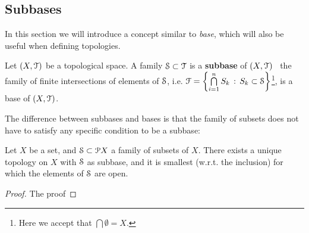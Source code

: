 \documentclass[12pt,spanish]{memoir}
\begin{document}
\subsection{Subbases}

In this section we will introduce a concept similar to \emph{base}, which will also be useful when defining topologies.

\begin{definition}
Let $(X, \T)$ be a topological space. A family $\S\subset \T$ is a \textbf{subbase} of $(X, \T)$ \iff\ the family of finite intersections of elements of $\S$,  i.e. $\F = \setdef{\bigcap\limits_{i=1}^nS_k}{S_k\subset \S}$\footnote{Here we accept that $\bigcap \emptyset = X$.}, is a base of $(X, \T)$.
\label{def:subbase}
\end{definition}

The difference between subbases and bases is that the family of subsets does not have to satisfy any specific condition to be a subbase:

\begin{theorem}
Let $X$ be a set, and $\S\subset \P X$ a family of subsets of $X$. There exists a unique topology on $X$ with $\S$ as subbase, and it is smallest (w.r.t. the inclusion) for which the elements of $\S$ are open.
\end{theorem}

\begin{proof}
The proof 
\end{proof}
\end{document}
